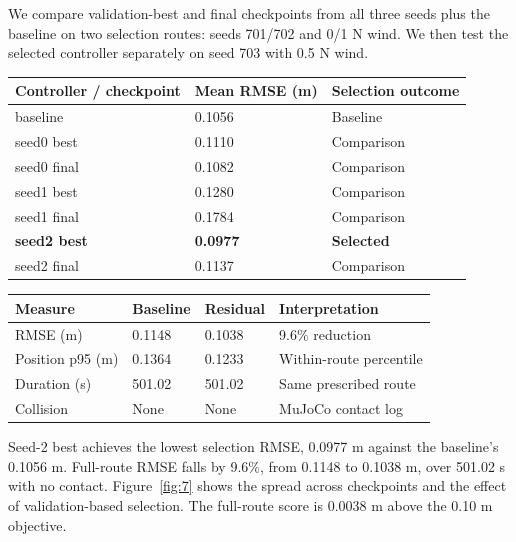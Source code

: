 \documentclass[a4paper,11pt]{article}
\begin{document}
We compare validation-best and final checkpoints from all three seeds plus the baseline on two selection routes: seeds 701/702 and 0/1 N wind. We then test the selected controller separately on seed 703 with 0.5 N wind.

\par\addvspace{8pt}\noindent\begin{minipage}{\linewidth}\centering
{}\label{tab:10}
\begin{tabular}{C{0.290\dimexpr\linewidth-24pt\relax}C{0.290\dimexpr\linewidth-24pt\relax}C{0.420\dimexpr\linewidth-24pt\relax}}
\toprule
\textbf{Controller / checkpoint} & \textbf{Mean RMSE (m)} & \textbf{Selection outcome}\\\midrule
baseline & 0.1056 & Baseline\\
seed0 best & 0.1110 & Comparison\\
seed0 final & 0.1082 & Comparison\\
seed1 best & 0.1280 & Comparison\\
seed1 final & 0.1784 & Comparison\\
\textbf{seed2 best} & \textbf{0.0977} & \textbf{Selected}\\
seed2 final & 0.1137 & Comparison\\
\bottomrule\end{tabular}\end{minipage}\par\addvspace{8pt}
\par\addvspace{8pt}\noindent\begin{minipage}{\linewidth}\centering
{}\label{tab:11}
\begin{tabular}{C{0.190\dimexpr\linewidth-32pt\relax}C{0.190\dimexpr\linewidth-32pt\relax}C{0.190\dimexpr\linewidth-32pt\relax}C{0.430\dimexpr\linewidth-32pt\relax}}
\toprule
\textbf{Measure} & \textbf{Baseline} & \textbf{Residual} & \textbf{Interpretation}\\\midrule
RMSE (m) & 0.1148 & 0.1038 & 9.6\% reduction\\
Position p95 (m) & 0.1364 & 0.1233 & Within-route percentile\\
Duration (s) & 501.02 & 501.02 & Same prescribed route\\
Collision & None & None & MuJoCo contact log\\
\bottomrule\end{tabular}\end{minipage}\par\addvspace{8pt}
Seed-2 best achieves the lowest selection RMSE, 0.0977 m against the baseline's 0.1056 m. Full-route RMSE falls by 9.6\%, from 0.1148 to 0.1038 m, over 501.02 s with no contact. Figure~\ref{fig:7} shows the spread across checkpoints and the effect of validation-based selection. The full-route score is 0.0038 m above the 0.10 m objective.
\end{document}
